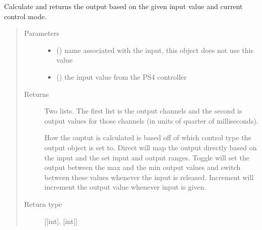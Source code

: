 \documentclass[letterpaper,10pt,english]{sphinxmanual}
\begin{document}
\begin{fulllineitems}
\begin{fulllineitems}
\end{fulllineitems}


\begin{fulllineitems}
\label{\detokenize{generic:AnalogMixerOutput.AnalogMixerOutput.get_output}}
\sphinxAtStartPar
Calculate and returns the output based on the given input value and 
current control mode.
\begin{quote}\begin{description}
\item[{Parameters}] \leavevmode\begin{itemize}
\item {} 
\sphinxAtStartPar
{} () \textendash{} name associated with the input, this object does not 
use this value

\item {} 
\sphinxAtStartPar
{} () \textendash{} the input value from the PS4 controller

\end{itemize}

\item[{Returns}] \leavevmode
\sphinxAtStartPar

\sphinxAtStartPar
Two lists. The first list is the output channels and the second 
is output values for those channels (in units of quarter of milliseconds).

\sphinxAtStartPar
How the ouptut is calculated is based off of which control type the output 
object is set to. Direct will map the output directly based on the input 
and the set input and output ranges. Toggle will set the output between the 
max and the min output values and switch between these values whenever the 
input is released. Increment will increment the output value whenever input 
is given.


\item[{Return type}] \leavevmode
\sphinxAtStartPar
{[}{[}int{]}, {[}int{]}{]}

\end{description}\end{quote}


\end{fulllineitems}
\end{fulllineitems}
\end{document}
